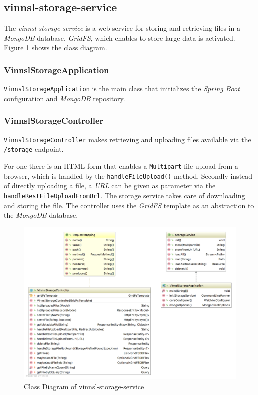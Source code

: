 \subsection{vinnsl-storage-service}\label{vinnsl-storage-service}

The \emph{vinnsl storage service} is a web service for storing and
retrieving files in a \emph{MongoDB} database. \emph{GridFS}, which
enables to store large data is activated. Figure
\ref{class_vinnsl-storage-service} shows the class diagram.

\subsubsection{VinnslStorageApplication}\label{vinnslstorageapplication}

\texttt{VinnslStorageApplication} is the main class that initializes the
\emph{Spring Boot} configuration and \emph{MongoDB} repository.

\subsubsection{VinnslStorageController}\label{vinnslstoragecontroller}

\texttt{VinnslStorageController} makes retrieving and uploading files
available via the \texttt{/storage} endpoint.

For one there is an HTML form that enables a \texttt{Multipart} file
upload from a browser, which is handled by the
\texttt{handleFileUpload()} method. Secondly instead of directly
uploading a file, a \emph{URL} can be given as parameter via the
\texttt{handleRestFileUploadFromUrl}. The storage service takes care of
downloading and storing the file. The controller uses the \emph{GridFS}
template as an abstraction to the \emph{MongoDB} database.

\begin{figure}
\centering
\includegraphics[width=15.00000cm]{images/uml-class-diagram-vinnsl-storage-service}
\caption{Class Diagram of vinnsl-storage-service
\label{class_vinnsl-storage-service}}
\end{figure}

